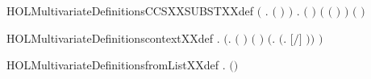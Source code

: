 \begin{SaveVerbatim}{HOLMultivariateDefinitionsCCSXXSUBSTXXdef}
   \ensuremath{(}\HOLSymConst{\HOLTokenForall{}} .
          \ensuremath{(} \ensuremath{)} \HOLSymConst{\ensuremath{=}}
          \HOLConst{\HOLTokenIn{}}         \ensuremath{)} \HOLSymConst{\HOLTokenConj{}}
   \HOLSymConst{\HOLTokenForall{}}  .
         \ensuremath{(}  \ensuremath{)} \HOLSymConst{\ensuremath{=}}
         \HOLConst{\HOLTokenIn{}}      \ensuremath{(} \ensuremath{(} \HOLSymConst{\ensuremath{\setminus}} \ensuremath{)} \ensuremath{)}
          \ensuremath{(}  \ensuremath{)}
\end{SaveVerbatim}
\newcommand{\HOLMultivariateDefinitionsCCSXXSUBSTXXdef}{\UseVerbatim{HOLMultivariateDefinitionsCCSXXSUBSTXXdef}}
\begin{SaveVerbatim}{HOLMultivariateDefinitionscontextXXdef}
\HOLTokenTurnstile{} \HOLSymConst{\HOLTokenForall{}}.
         \HOLSymConst{\ensuremath{=}}
       \ensuremath{(}\HOLTokenLambda{}.
             \ensuremath{(} \ensuremath{)} \ensuremath{(} \ensuremath{)} \HOLSymConst{\HOLTokenConj{}}
             \ensuremath{(}\HOLTokenLambda{}.  \ensuremath{(}\HOLTokenLambda{}. \ensuremath{[}\ensuremath{/}\ensuremath{]} \ensuremath{)}\ensuremath{)} \ensuremath{)}
\end{SaveVerbatim}
\newcommand{\HOLMultivariateDefinitionscontextXXdef}{\UseVerbatim{HOLMultivariateDefinitionscontextXXdef}}
\begin{SaveVerbatim}{HOLMultivariateDefinitionsfromListXXdef}
\HOLTokenTurnstile{} \HOLSymConst{\HOLTokenForall{}} .    \HOLSymConst{\ensuremath{=}}  \HOLSymConst{|++}  \ensuremath{(}\HOLSymConst{,}\ensuremath{)}
\end{SaveVerbatim}
